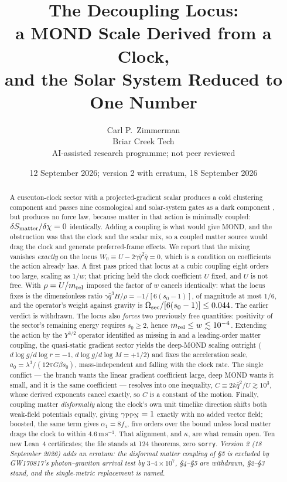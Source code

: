 \documentclass[11pt,letterpaper]{article}
\title{The Decoupling Locus:\\ a MOND Scale Derived from a Clock,\\ and the Solar System Reduced to One Number}
\author{Carl P.\ Zimmerman\\ \small Briar Creek Tech\\ \small AI-assisted research programme; not peer reviewed}
\date{12 September 2026; version 2 with erratum, 18 September 2026}
\begin{document}
\maketitle
\begin{abstract}
A cuscuton-clock sector with a projected-gradient scalar produces a cold clustering component and passes nine cosmological and solar-system gates as a dark component \cite{paper19,paper20,paper21,paper22}, but produces no force law, because matter in that action is minimally coupled: $\delta S_{\rm matter}/\delta\chi=0$ identically. Adding a coupling is what would give MOND, and the obstruction was that the clock and the scalar mix, so a coupled matter source would drag the clock and generate preferred-frame effects. We report that the mixing vanishes \emph{exactly} on the locus $W_0\equiv U-2\gamma\bar q^2\dot{\bar q}=0$, which is a condition on coefficients the action already has. A first pass priced that locus at a cubic coupling eight orders too large, scaling as $1/w$; that pricing held the clock coefficient $U$ fixed, and $U$ is not free. With $\rho=U/m_{\rm rel}$ imposed the factor of $w$ cancels identically: what the locus fixes is the dimensionless ratio $\gamma\bar q^3H/\rho=-1/[6(s_0-1)]$, of magnitude at most $1/6$, and the operator's weight against gravity is $\Omega_{\rm sec}/[6(s_0-1)]\le0.044$. The earlier verdict is withdrawn. The locus also \emph{forces} two previously free quantities: positivity of the sector's remaining energy requires $s_0\ge2$, hence $m_{\rm rel}\le w\lesssim10^{-4}$. Extending the action by the $Y^{3/2}$ operator identified as missing in \cite{paper23} and a leading-order matter coupling, the quasi-static gradient sector yields the deep-MOND scaling outright ($d\log g/d\log r=-1$, $d\log g/d\log M=+1/2$) and fixes the acceleration scale, $a_0=\lambda^3/(12\pi G\beta s_0)$, mass-independent and falling with the clock rate. The single conflict --- the branch wants the linear gradient coefficient large, deep MOND wants it small, and it is the same coefficient --- resolves into one inequality, $C\equiv2k\bar q^2/U\gtrsim10^3$, whose derived exponents cancel exactly, so $C$ is a constant of the motion. Finally, coupling matter \emph{disformally} along the clock's own unit timelike direction shifts both weak-field potentials equally, giving $\gamma_{\rm PPN}=1$ exactly with no added vector field; boosted, the same term gives $\alpha_1=8f_s$, five orders over the bound unless local matter drags the clock to within $4.6\,$m$\,$s$^{-1}$. That alignment, and $\kappa$, are what remain open. Ten new Lean~4 certificates; the file stands at 124 theorems, zero \texttt{sorry}.
 \emph{Version 2 (18 September 2026) adds an erratum: the disformal matter coupling of \S5 is excluded by GW170817's photon--graviton arrival test by $3$--$4\times10^{7}$, \S4--\S5 are withdrawn, \S2--\S3 stand, and the single-metric replacement is named.}
\end{abstract}
\end{document}
